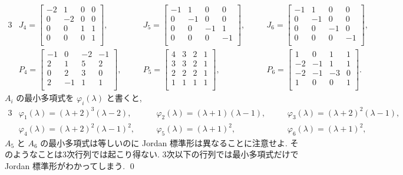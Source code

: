\documentclass[12pt,twoside]{jarticle}
\begin{document}
{{\begin{alignat*}{3}
  &
  J_4 =
  \begin{bmatrix}
    -2 &  1 &  0 &  0 \\
     0 & -2 &  0 &  0 \\
     0 &  0 &  1 &  1 \\
     0 &  0 &  0 &  1 \\
  \end{bmatrix},
  & \quad &
  J_5 =
  \begin{bmatrix}
    -1 &  1 &  0 &  0 \\
     0 & -1 &  0 &  0 \\
     0 &  0 & -1 &  1 \\
     0 &  0 &  0 & -1 \\
  \end{bmatrix},
  & \quad &
  J_6 =
  \begin{bmatrix}
    -1 &  1 &  0 &  0 \\
     0 & -1 &  0 &  0 \\
     0 &  0 & -1 &  0 \\
     0 &  0 &  0 & -1 \\
  \end{bmatrix},
  \\ &
  P_4 =
  \begin{bmatrix}
    -1 &  0 & -2 & -1 \\
     2 &  1 &  5 &  2 \\
     0 &  2 &  3 &  0 \\
     2 & -1 &  1 &  1 \\
  \end{bmatrix},
  & \quad &
  P_5 =
  \begin{bmatrix}
    4 & 3 & 2 & 1 \\
    3 & 3 & 2 & 1 \\
    2 & 2 & 2 & 1 \\
    1 & 1 & 1 & 1 \\
  \end{bmatrix},
  & \quad &
  P_6 =
  \begin{bmatrix}
     1 &  0 &  1 &  1 \\
    -2 & -1 &  1 &  1 \\
    -2 & -1 & -3 &  0 \\
     1 &  0 &  0 &  1 \\
  \end{bmatrix}.
\end{alignat*}
}$A_i$ の最小多項式を $\varphi_i(\lambda)$ と書くと,
{\small
\begin{alignat*}{3}
  &
  \varphi_1(\lambda) = (\lambda+2)^3(\lambda-2),
  & \quad &
  \varphi_2(\lambda) = (\lambda+1)(\lambda-1),
  & \quad &
  \varphi_3(\lambda) = (\lambda+2)^2(\lambda-1),
  \\ &
  \varphi_4(\lambda) = (\lambda+2)^2(\lambda-1)^2,
  & \quad &
  \varphi_5(\lambda) = (\lambda+1)^2,
  & \quad &
  \varphi_6(\lambda) = (\lambda+1)^2,
\end{alignat*}
}$A_5$ と $A_6$ の最小多項式は等しいのに Jordan 標準形は異なることに注意せよ.
そのようなことは3次行列では起こり得ない. 3次以下の行列では最小多項式だけで 
Jordan 標準形がわかってしまう.
\qed
}
\end{document}

